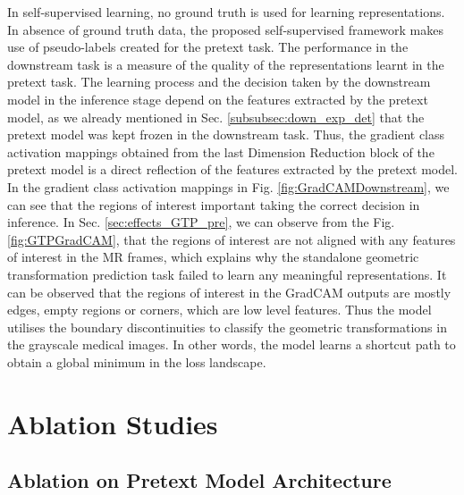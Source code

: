 \documentclass[journal]{IEEEtai}
\begin{document}
\indent In self-supervised learning, no ground truth is used for learning representations. In absence of ground truth data, the proposed self-supervised framework makes use of pseudo-labels created for the pretext task. The performance in the downstream task is a measure of the quality of the representations learnt in the pretext task. The learning process and the decision taken by the downstream model in the inference stage depend on the features extracted by the pretext model, as we already mentioned in Sec. \ref{subsubsec:down_exp_det} that the pretext model was kept frozen in the downstream task. Thus, the gradient class activation mappings obtained from the last Dimension Reduction block of the pretext model is a direct reflection of the features extracted by the pretext model. In the gradient class activation mappings in Fig. \ref{fig:GradCAMDownstream}, we can see that the regions of interest important taking the correct decision in inference. In Sec. \ref{sec:effects_GTP_pre}, we can observe from the Fig. \ref{fig:GTPGradCAM}, that the regions of interest are not aligned with any features of interest in the MR frames, which explains why the standalone geometric transformation prediction task failed to learn any meaningful representations. It can be observed that the regions of interest in the GradCAM \cite{gradcam} outputs are mostly edges, empty regions or corners, which are low level features. Thus the model utilises the boundary discontinuities to classify the geometric transformations in the grayscale medical images. In other words, the model learns a shortcut path to obtain a global minimum in the loss landscape.


\section{Ablation Studies}
\label{sec: more_abl}

\subsection{Ablation on Pretext Model Architecture}
\label{subsec:ablation_studies}
\end{document}
